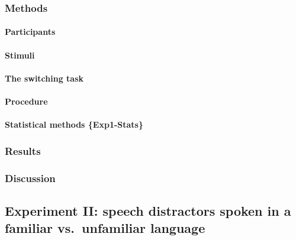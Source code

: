 \documentclass[a4paper,nobind]{templates/ociamthesis}
\begin{document}
\hypertarget{methods}{%
\subsubsection{Methods}\label{methods}}

\hypertarget{participants}{%
\paragraph{Participants}\label{participants}}

\hypertarget{stimuli}{%
\paragraph{Stimuli}\label{stimuli}}

\hypertarget{the-switching-task}{%
\paragraph{The switching task}\label{the-switching-task}}

\hypertarget{procedure}{%
\paragraph{Procedure}\label{procedure}}

\hypertarget{statistical-methods-exp1-stats}{%
\paragraph{Statistical methods \{Exp1-Stats\}}\label{statistical-methods-exp1-stats}}

\hypertarget{results}{%
\subsubsection{Results}\label{results}}

\hypertarget{discussion}{%
\subsubsection{Discussion}\label{discussion}}

\hypertarget{experiment-ii-speech-distractors-spoken-in-a-familiar-vs.-unfamiliar-language}{%
\subsection{Experiment II: speech distractors spoken in a familiar vs.~unfamiliar language}\label{experiment-ii-speech-distractors-spoken-in-a-familiar-vs.-unfamiliar-language}}
\end{document}
